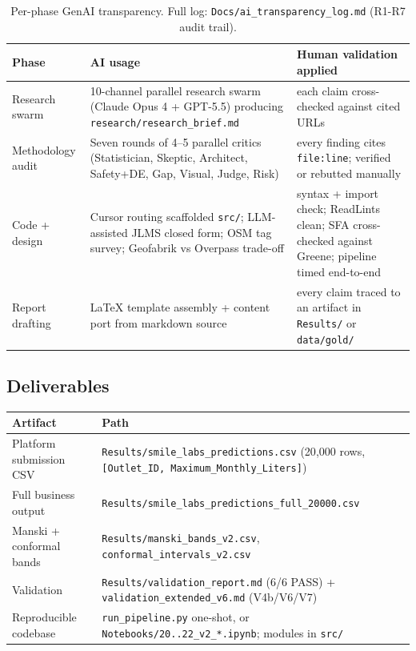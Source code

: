 \documentclass[10pt,a4paper]{article}
\begin{document}
\begin{table}[H]
\centering
\renewcommand{\arraystretch}{0.95}
\scriptsize
\begin{tabularx}{\textwidth}{lXX}
\toprule
\rowcolor{soft}\textbf{Phase} & \textbf{AI usage} & \textbf{Human validation applied} \\
\midrule
Research swarm     & 10-channel parallel research swarm (Claude Opus 4 + GPT-5.5) producing \texttt{research/research\_brief.md} & each claim cross-checked against cited URLs \\
Methodology audit  & Seven rounds of 4--5 parallel critics (Statistician, Skeptic, Architect, Safety+DE, Gap, Visual, Judge, Risk) & every finding cites \texttt{file:line}; verified or rebutted manually \\
Code + design      & Cursor routing scaffolded \texttt{src/}; LLM-assisted JLMS closed form; OSM tag survey; Geofabrik vs Overpass trade-off & syntax + import check; ReadLints clean; SFA cross-checked against Greene; pipeline timed end-to-end \\
Report drafting    & LaTeX template assembly + content port from markdown source & every claim traced to an artifact in \texttt{Results/} or \texttt{data/gold/} \\
\bottomrule
\end{tabularx}
\caption{Per-phase GenAI transparency. Full log: \texttt{Docs/ai\_transparency\_log.md} (R1-R7 audit trail).}
\end{table}

\subsection{Deliverables}

\vspace{-0.5em}
\begin{table}[H]
\centering
\renewcommand{\arraystretch}{0.95}
\scriptsize
\begin{tabularx}{\textwidth}{lX}
\toprule
\rowcolor{soft}\textbf{Artifact} & \textbf{Path} \\
\midrule
Platform submission CSV  & \texttt{Results/smile\_labs\_predictions.csv} (20{,}000 rows, \texttt{[Outlet\_ID, Maximum\_Monthly\_Liters]}) \\
Full business output     & \texttt{Results/smile\_labs\_predictions\_full\_20000.csv} \\
Manski + conformal bands & \texttt{Results/manski\_bands\_v2.csv}, \texttt{conformal\_intervals\_v2.csv} \\
Validation               & \texttt{Results/validation\_report.md} (6/6 PASS) + \texttt{validation\_extended\_v6.md} (V4b/V6/V7) \\
Reproducible codebase    & \texttt{run\_pipeline.py} one-shot, or \texttt{Notebooks/20..22\_v2\_*.ipynb}; modules in \texttt{src/} \\
\bottomrule
\end{tabularx}
\end{table}
\vspace{-0.6em}
\end{document}
